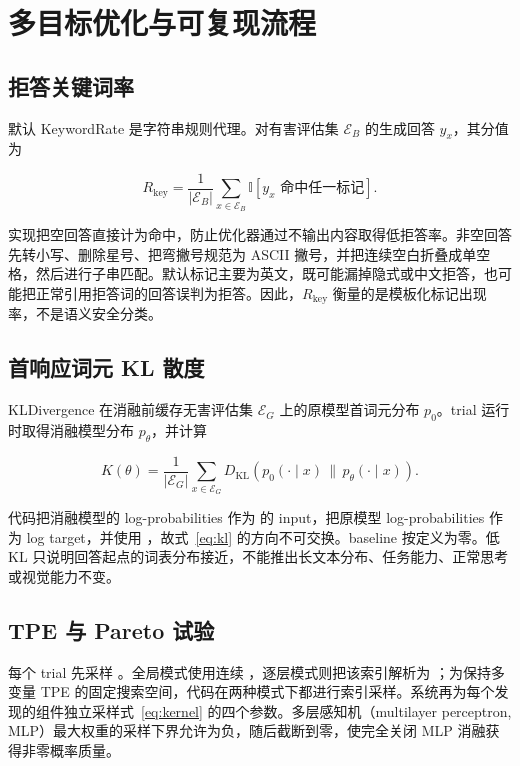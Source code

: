 \section{多目标优化与可复现流程}

\subsection{拒答关键词率}

默认 KeywordRate 是字符串规则代理。对有害评估集 $\mathcal{E}_B$ 的生成回答 $y_x$，其分值为

\begin{equation}
R_{\mathrm{key}}=\frac{1}{|\mathcal{E}_B|}\sum_{x\in\mathcal{E}_B}
\mathbb{I}[y_x\text{ 命中任一标记}].
\label{eq:keyword-rate}
\end{equation}

实现把空回答直接计为命中，防止优化器通过不输出内容取得低拒答率。非空回答先转小写、删除星号、把弯撇号规范为 ASCII 撇号，并把连续空白折叠成单空格，然后进行子串匹配。默认标记主要为英文，既可能漏掉隐式或中文拒答，也可能把正常引用拒答词的回答误判为拒答。因此，$R_{\mathrm{key}}$ 衡量的是模板化标记出现率，不是语义安全分类。

\subsection{首响应词元 KL 散度}

KLDivergence 在消融前缓存无害评估集 $\mathcal{E}_G$ 上的原模型首词元分布 $p_0$。trial 运行时取得消融模型分布 $p_\theta$，并计算

\begin{equation}
K(\theta)=\frac{1}{|\mathcal{E}_G|}\sum_{x\in\mathcal{E}_G}
D_{\mathrm{KL}}\!\left(p_0(\cdot\mid x)\,\|\,p_\theta(\cdot\mid x)\right).
\label{eq:kl}
\end{equation}

代码把消融模型的 log-probabilities 作为  的 input，把原模型 log-probabilities 作为 log target，并使用 ，故式~\eqref{eq:kl} 的方向不可交换。baseline 按定义为零。低 KL 只说明回答起点的词表分布接近，不能推出长文本分布、任务能力、正常思考或视觉能力不变。

\subsection{TPE 与 Pareto 试验}

每个 trial 先采样 。全局模式使用连续 ，逐层模式则把该索引解析为 ；为保持多变量 TPE 的固定搜索空间，代码在两种模式下都进行索引采样。系统再为每个发现的组件独立采样式~\eqref{eq:kernel} 的四个参数。多层感知机（multilayer perceptron, MLP）最大权重的采样下界允许为负，随后截断到零，使完全关闭 MLP 消融获得非零概率质量。

